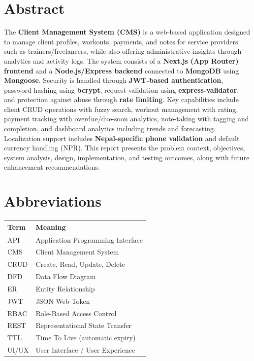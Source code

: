 \documentclass[12pt,a4paper]{report}
\begin{document}
\chapter*{Abstract}
The \textbf{Client Management System (CMS)} is a web-based application designed to manage client profiles, workouts, payments, and notes for service providers such as trainers/freelancers, while also offering administrative insights through analytics and activity logs. The system consists of a \textbf{Next.js (App Router) frontend} and a \textbf{Node.js/Express backend} connected to \textbf{MongoDB} using \textbf{Mongoose}. Security is handled through \textbf{JWT-based authentication}, password hashing using \textbf{bcrypt}, request validation using \textbf{express-validator}, and protection against abuse through \textbf{rate limiting}. Key capabilities include client CRUD operations with fuzzy search, workout management with rating, payment tracking with overdue/due-soon analytics, note-taking with tagging and completion, and dashboard analytics including trends and forecasting. Localization support includes \textbf{Nepal-specific phone validation} and default currency handling (NPR). This report presents the problem context, objectives, system analysis, design, implementation, and testing outcomes, along with future enhancement recommendations.

\tableofcontents
\listoffigures
\listoftables

\chapter*{Abbreviations}
\begin{longtable}{@{}p{2.5cm}p{11cm}@{}}
\toprule
\textbf{Term} & \textbf{Meaning}\\
\midrule
API & Application Programming Interface\\
CMS & Client Management System\\
CRUD & Create, Read, Update, Delete\\
DFD & Data Flow Diagram\\
ER & Entity Relationship\\
JWT & JSON Web Token\\
RBAC & Role-Based Access Control\\
REST & Representational State Transfer\\
TTL & Time To Live (automatic expiry)\\
UI/UX & User Interface / User Experience\\
\bottomrule
\end{longtable}
\end{document}
